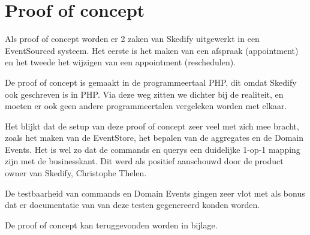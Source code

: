 
\chapter{Proof of concept}
\label{ch:POC}

Als proof of concept worden er 2 zaken van Skedify uitgewerkt in een EventSourced systeem. Het eerste is het maken van een afspraak (appointment) en het tweede het wijzigen van een appointment (reschedulen).

De proof of concept is gemaakt in de programmeertaal PHP, dit omdat Skedify ook geschreven is in PHP. Via deze weg zitten we dichter bij de realiteit, en moeten er ook geen andere programmeertalen vergeleken worden met elkaar.

Het blijkt dat de setup van deze proof of concept zeer veel met zich mee bracht, zoals het maken van de EventStore, het bepalen van de aggregates en de Domain Events. Het is wel zo dat de \Glspl{command} en \Glspl{query} een duidelijke 1-op-1 mapping zijn met de businesskant. Dit werd als positief aanschouwd door de product owner van Skedify, Christophe Thelen.

De testbaarheid van \Glspl{command} en Domain Events gingen zeer vlot met als bonus dat er documentatie van van deze testen gegenereerd konden worden.

De proof of concept kan teruggevonden worden in bijlage.